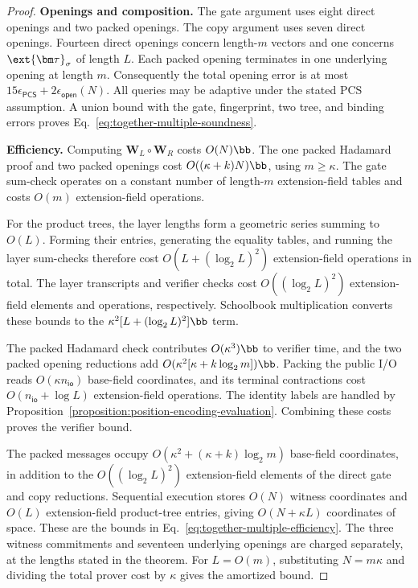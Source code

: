 \begin{proof}
\noindent\textbf{Openings and composition.}
The gate argument uses eight direct openings and two packed
openings. The copy argument uses seven direct openings.
Fourteen direct openings concern length-\(m\) vectors and
one concerns \(\ext{\bm\tau}_\sigma\) of length \(L\).
Each packed opening terminates in one underlying opening at
length \(m\). Consequently the total opening error is at most
\(15\epsilon_{\mathsf{PCS}}+2\epsilon_{\mathsf{open}}(N)\).
All queries may be adaptive under the stated PCS assumption.
A union bound with the gate, fingerprint, two tree, and binding
errors proves Eq.~\eqref{eq:together-multiple-soundness}.

\noindent\textbf{Efficiency.}
Computing \(\bm W_L\circ\bm W_R\) costs \(O(N)\bb\).
The one packed Hadamard proof and two packed openings cost
\(O((\kappa+k)N)\bb\), using \(m\geq\kappa\).
The gate sum-check operates on a constant number of
length-\(m\) extension-field tables and costs
\(O(m)\) extension-field operations.

For the product trees, the layer lengths form a geometric
series summing to \(O(L)\). Forming their entries, generating
the equality tables, and running the layer sum-checks therefore
cost \(O(L+(\log_2L)^2)\) extension-field operations in total.
The layer transcripts and verifier checks cost
\(O((\log_2L)^2)\) extension-field elements and operations,
respectively.
Schoolbook multiplication converts these bounds to the
\(\kappa^2[L+(\log_2L)^2]\bb\) term.

The packed Hadamard check contributes \(O(\kappa^3)\bb\)
to verifier time, and the two packed opening reductions add
\(O(\kappa^2[\kappa+k\log_2m])\bb\).
Packing the public I/O reads \(O(\kappa n_{\mathsf{io}})\)
base-field coordinates, and its terminal contractions cost
\(O(n_{\mathsf{io}}+\log L)\) extension-field operations.
The identity labels are handled by
Proposition~\ref{proposition:position-encoding-evaluation}.
Combining these costs proves the verifier bound.

The packed messages occupy \(O(\kappa^2+(\kappa+k)\log_2m)\)
base-field coordinates, in addition to the
\(O((\log_2L)^2)\) extension-field elements of the direct
gate and copy reductions.
Sequential execution stores \(O(N)\) witness coordinates and
\(O(L)\) extension-field product-tree entries, giving
\(O(N+\kappa L)\) coordinates of space.
These are the bounds in
Eq.~\eqref{eq:together-multiple-efficiency}.
The three witness commitments and seventeen underlying openings
are charged separately, at the lengths stated in the theorem.
For \(L=O(m)\), substituting \(N=m\kappa\) and dividing the
total prover cost by \(\kappa\) gives the amortized bound.
\end{proof}
